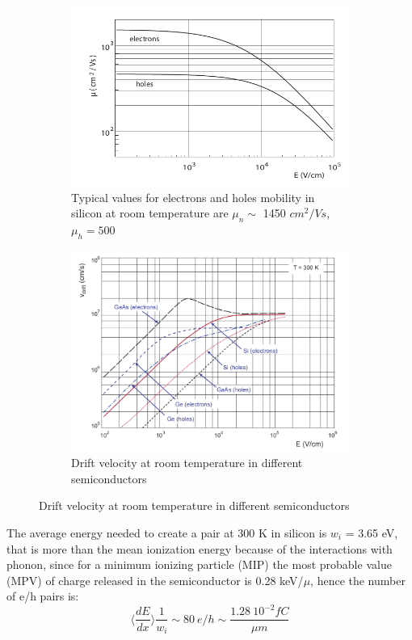     \begin{figure}[h!]
        \begin{subfigure}{.5\textwidth}
        \centering
        \includegraphics[width=.8\linewidth]{figures/Pixel_detectors/mobility_in_semiconductor.png}
        \caption{Typical values for electrons and holes mobility 
        in silicon at room temperature are $\mu _n \sim$ 1450 $cm^2/Vs$, $\mu _h = 500$}
        \label{fig:mobility_drift1}
        \end{subfigure}
        \begin{subfigure}{.5\textwidth}
        \centering
        \includegraphics[width=.8\linewidth]{figures/Pixel_detectors/velocity_in_semiconductor.png}
        \caption{Drift velocity at room temperature in different semiconductors}
        \label{fig:mobility_drift2}
        \end{subfigure}
        \label{fig:mobility_drift}
    \end{figure}

    The average energy needed to create a pair at 300 K in silicon is $w_i$ = 3.65 eV, that is more than the mean ionization energy because of the interactions with phonon, since for a minimum ionizing particle (MIP) the most probable value (MPV) of charge released in the semiconductor is 0.28 keV/$\mu$, hence the number of e/h pairs is: 
    \begin{equation}
        \langle \frac{dE}{dx}\rangle \frac{1}{w_i} \sim 80 \: e/h \sim \frac{1.28 \:10^{-2}fC}{\mu m}
    \end{equation}

